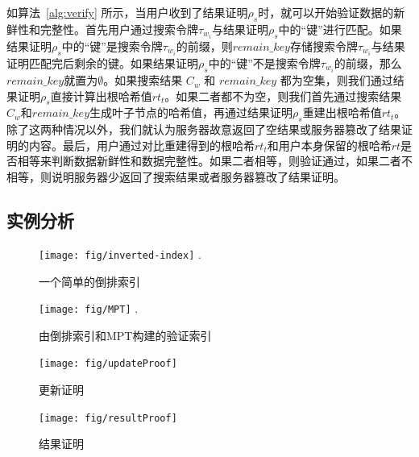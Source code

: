 如算法~\ref{alg:verify} 所示，当用户收到了结果证明$\rho_s$时，就可以开始验证数据的新鲜性和完整性。首先用户通过搜索令牌$\tau_{w_i}$与结果证明$\rho_s$中的“键”进行匹配。如果结果证明$\rho_s$中的“键”是搜索令牌$\tau_{w_i}$的前缀，则$remain\_key$存储搜索令牌$\tau_{w_i}$与结果证明匹配完后剩余的键。如果结果证明$\rho_s$中的“键”不是搜索令牌$\tau_{w_i}$的前缀，那么$remain\_key$就置为$\emptyset$。如果搜索结果 $C_{w}$ 和 $remain\_key$ 都为空集，则我们通过结果证明$\rho_s$直接计算出根哈希值$rt_t$。如果二者都不为空，则我们首先通过搜索结果$C_{w}$和$remain\_key$生成叶子节点的哈希值，再通过结果证明$\rho_s$重建出根哈希值$rt_t$。除了这两种情况以外，我们就认为服务器故意返回了空结果或服务器篡改了结果证明的内容。最后，用户通过对比重建得到的根哈希$rt_t$和用户本身保留的根哈希$rt$是否相等来判断数据新鲜性和数据完整性。如果二者相等，则验证通过，如果二者不相等，则说明服务器少返回了搜索结果或者服务器篡改了结果证明。



\subsection{实例分析}
\label{sec:example}

\begin{figure}[ht]
\centering
\texttt{[image: fig/inverted-index]}
\DeclareGraphicsExtensions.
\caption{一个简单的倒排索引}
\label{fig:inverted-index}
\end{figure}

\begin{figure}[ht]
\centering
\texttt{[image: fig/MPT]}
\DeclareGraphicsExtensions.
\caption{由倒排索引和MPT构建的验证索引}
\label{fig:inverted-index}
\end{figure}


\begin{figure}[ht]
  \begin{minipage}[b]{0.49\textwidth}
    \texttt{[image: fig/updateProof]}
    \caption{更新证明}
    \label{fig:updateProof}
  \end{minipage}
  \begin{minipage}[b]{0.49\textwidth}
    \texttt{[image: fig/resultProof]}
    \caption{结果证明}
    \label{fig:resultProof}
  \end{minipage}
\centering
\end{figure}

